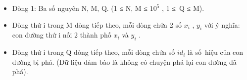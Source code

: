 \begin{itemize}
	\item     Dòng 1: Ba số nguyên N, M, Q. (1 ≤ N, M ≤ $10^{5}$    , 1 ≤ Q ≤ M).   
	\item     Dòng thứ i trong M dòng tiếp theo, mỗi dòng chứa 2 số $x_{i}$    , $y_{i}$    với ý nghĩa: con đường thứ i nối 2 thành phố $x_{i}$    và $y_{i}$    .   
	\item     Dòng thứ i trong Q dòng tiếp theo, mỗi dòng chứa số $id_{i}$    là số hiệu của con đường bị phá. (Dữ liệu đảm bào là không có chuyện phá lại con đường đã phá).   
\end{itemize}